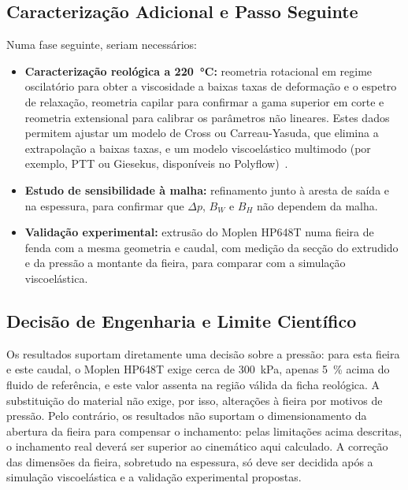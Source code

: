 \subsection{Caracterização Adicional e Passo Seguinte}

Numa fase seguinte, seriam necessários:
\begin{itemize}
    \item \textbf{Caracterização reológica a \qty{220}{\celsius}:} reometria rotacional em regime oscilatório para obter a viscosidade a baixas taxas de deformação e o espetro de relaxação, reometria capilar para confirmar a gama superior em corte e reometria extensional para calibrar os parâmetros não lineares. Estes dados permitem ajustar um modelo de Cross ou Carreau-Yasuda, que elimina a extrapolação a baixas taxas, e um modelo viscoelástico multimodo (por exemplo, PTT ou Giesekus, disponíveis no Polyflow)~\cite{Tang2019Polypropylene}.
    \item \textbf{Estudo de sensibilidade à malha:} refinamento junto à aresta de saída e na espessura, para confirmar que $\Delta p$, $B_W$ e $B_H$ não dependem da malha.
    \item \textbf{Validação experimental:} extrusão do Moplen HP648T numa fieira de fenda com a mesma geometria e caudal, com medição da secção do extrudido e da pressão a montante da fieira, para comparar com a simulação viscoelástica.
\end{itemize}

\subsection{Decisão de Engenharia e Limite Científico}

Os resultados suportam diretamente uma decisão sobre a pressão: para esta fieira e este caudal, o Moplen HP648T exige cerca de \qty{300}{\kilo\pascal}, apenas \qty{5}{\percent} acima do fluido de referência, e este valor assenta na região válida da ficha reológica. A substituição do material não exige, por isso, alterações à fieira por motivos de pressão. Pelo contrário, os resultados não suportam o dimensionamento da abertura da fieira para compensar o inchamento: pelas limitações acima descritas, o inchamento real deverá ser superior ao cinemático aqui calculado. A correção das dimensões da fieira, sobretudo na espessura, só deve ser decidida após a simulação viscoelástica e a validação experimental propostas.
